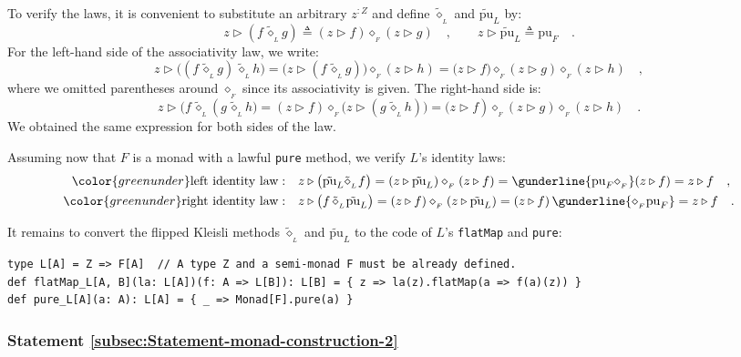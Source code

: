 To verify the laws, it is convenient to substitute an arbitrary $z^{:Z}$
and define $\tilde{\diamond}_{_{L}}$ and $\tilde{\text{pu}}_{L}$
by:
\[
z\triangleright(f\,\tilde{\diamond}_{_{L}}g)\triangleq(z\triangleright f)\diamond_{_{F}}(z\triangleright g)\quad,\quad\quad z\triangleright\tilde{\text{pu}}_{L}\triangleq\text{pu}_{F}\quad.
\]
For the left-hand side of the associativity law, we write:
\[
z\triangleright\big((f\,\tilde{\diamond}_{_{L}}g)\,\tilde{\diamond}_{_{L}}h\big)=\big(z\triangleright(f\,\tilde{\diamond}_{_{L}}g)\big)\diamond_{_{F}}(z\triangleright h)=\big(z\triangleright f)\diamond_{_{F}}(z\triangleright g)\diamond_{_{F}}(z\triangleright h)\quad,
\]
where we omitted parentheses around $\diamond_{_{F}}$ since its associativity
is given. The right-hand side is:
\[
z\triangleright\big(f\,\tilde{\diamond}_{_{L}}(g\,\tilde{\diamond}_{_{L}}h\big)=(z\triangleright f)\diamond_{_{F}}\big(z\triangleright(g\,\tilde{\diamond}_{_{L}}h)\big)=\big(z\triangleright f)\diamond_{_{F}}(z\triangleright g)\diamond_{_{F}}(z\triangleright h)\quad.
\]
We obtained the same expression for both sides of the law.

Assuming now that $F$ is a monad with a lawful \lstinline!pure!
method, we verify $L$\textsf{'}s identity laws:
\begin{align*}
{\color{greenunder}\text{left identity law}:}\quad & z\triangleright\big(\tilde{\text{pu}}_{L}\tilde{\diamond}_{_{L}}f\big)=(z\triangleright\tilde{\text{pu}}_{L})\diamond_{_{F}}(z\triangleright f)=\gunderline{\text{pu}_{F}\diamond_{_{F}}}(z\triangleright f)=z\triangleright f\quad,\\
{\color{greenunder}\text{right identity law}:}\quad & z\triangleright\big(f\,\tilde{\diamond}_{_{L}}\tilde{\text{pu}}_{L}\big)=(z\triangleright f)\diamond_{_{F}}(z\triangleright\tilde{\text{pu}}_{L})=(z\triangleright f)\,\gunderline{\diamond_{_{F}}\text{pu}_{F}}=z\triangleright f\quad.
\end{align*}

It remains to convert the flipped Kleisli methods $\tilde{\diamond}_{_{L}}$
and $\tilde{\text{pu}}_{L}$ to the code of $L$\textsf{'}s \lstinline!flatMap!
and \lstinline!pure!:
\begin{lstlisting}
type L[A] = Z => F[A]  // A type Z and a semi-monad F must be already defined.
def flatMap_L[A, B](la: L[A])(f: A => L[B]): L[B] = { z => la(z).flatMap(a => f(a)(z)) }
def pure_L[A](a: A): L[A] = { _ => Monad[F].pure(a) }
\end{lstlisting}


\subsubsection{Statement \label{subsec:Statement-monad-construction-2}\ref{subsec:Statement-monad-construction-2}}

